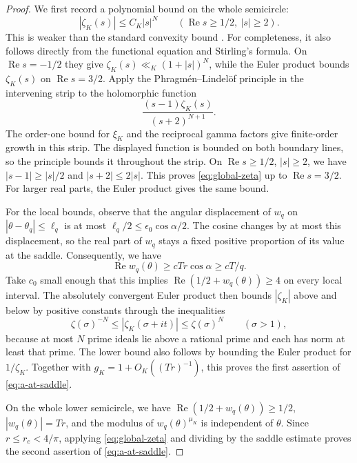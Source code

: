 \documentclass[11pt,reqno]{amsart}
\numberwithin{equation}{section}
\renewcommand{\Re}{\operatorname{Re}}
\begin{document}
\begin{proof}

We first record a polynomial bound on the whole semicircle:
\begin{equation}\label{eq:global-zeta}
 |\zeta_K(s)|\le C_K|s|^N
 \qquad(\Re s\ge1/2,\ |s|\ge2).
\end{equation}
This is weaker than the standard convexity bound
\cite[Proposition~3.8]{HSW}. For completeness, it also follows
directly from the functional equation and Stirling's formula.
On $\Re s=-1/2$ they give
$\zeta_K(s)\ll_K(1+|s|)^N$, while the Euler product bounds
$\zeta_K(s)$ on $\Re s=3/2$. Apply the Phragm\'en--Lindel\"of
principle in the intervening strip to the holomorphic function
\[
 \frac{(s-1)\zeta_K(s)}{(s+2)^{N+1}}.
\]
The order-one bound for $\xi_K$ and the reciprocal gamma factors
give finite-order growth in this strip. The displayed function is
bounded on both boundary lines, so the principle bounds it
throughout the strip. On $\Re s\ge1/2$,
$|s|\ge2$, we have $|s-1|\ge|s|/2$ and $|s+2|\le2|s|$.
This proves \eqref{eq:global-zeta} up to $\Re s=3/2$.
For larger real parts, the Euler product gives the same bound.


For the local bounds, observe that the angular displacement of
$w_q$ on $|\theta-\theta_q|\le\ell_q$ is at most
$\ell_q/2\le\epsilon_0\cos\alpha/2$. The cosine changes by at most
this displacement, so the real part of $w_q$ stays a fixed positive
proportion of its value at the saddle. Consequently, we have
\begin{equation}\label{eq:local-real-w}
 \Re w_q(\theta)\ge cTr\cos\alpha\ge cT/q.
\end{equation}
Take $c_0$ small enough that this implies
$\Re(1/2+w_q(\theta))\ge4$ on every local interval.
The absolutely convergent Euler product then bounds $|\zeta_K|$
above and below by positive constants through the inequalities
\[
 \zeta(\sigma)^{-N}\le |\zeta_K(\sigma+it)|
       \le\zeta(\sigma)^N\qquad(\sigma>1),
\]
because at most $N$ prime ideals lie above a rational prime and
each has norm at least that prime. The lower bound also follows
by bounding the Euler product for $1/\zeta_K$.
Together with $g_K=1+O_K((Tr)^{-1})$, this proves the first assertion
of \eqref{eq:a-at-saddle}.

On the whole lower semicircle, we have $\Re(1/2+w_q(\theta))\ge1/2$,
$|w_q(\theta)|=Tr$, and the modulus of $w_q(\theta)^{\mu_K}$ is
independent of $\theta$. Since $r\le r_e<4/\pi$, applying
\eqref{eq:global-zeta} and dividing by the saddle estimate proves
the second assertion of \eqref{eq:a-at-saddle}.


\end{proof}
\end{document}

